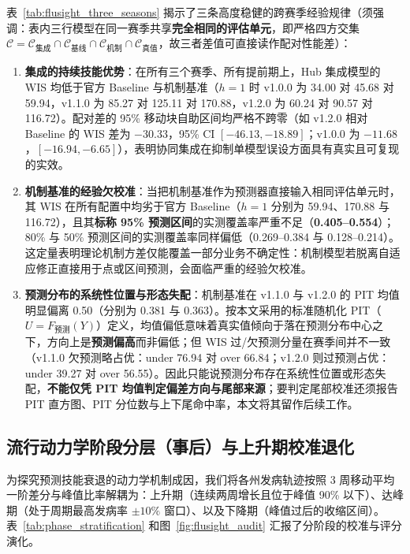 \documentclass[11pt,a4paper]{article}
\theoremstyle{plain}
\theoremstyle{definition}
\begin{document}
表~\ref{tab:flusight_three_seasons} 揭示了三条高度稳健的跨赛季经验规律（须强调：表内三行模型在同一赛季共享\textbf{完全相同的评估单元}，即严格四方交集 $\mathcal{C}=\mathcal{C}_{\text{集成}}\cap\mathcal{C}_{\text{基线}}\cap\mathcal{C}_{\text{机制}}\cap\mathcal{C}_{\text{真值}}$，故三者差值可直接读作配对性能差）：
\begin{enumerate}
\item \textbf{集成的持续技能优势}：在所有三个赛季、所有提前期上，Hub 集成模型的 WIS 均低于官方 Baseline 与机制基准（$h=1$ 时 v1.0.0 为 34.00 对 45.68 对 59.94，v1.1.0 为 85.27 对 125.11 对 170.88，v1.2.0 为 60.24 对 90.57 对 116.72）。配对差的 95\% 移动块自助区间均严格不跨零（如 v1.2.0 相对 Baseline 的 WIS 差为 $-30.33$，95\% CI $[-46.13, -18.89]$；v1.0.0 为 $-11.68$，$[-16.94, -6.65]$），表明协同集成在抑制单模型误设方面具有真实且可复现的实效。
\item \textbf{机制基准的经验欠校准}：当把机制基准作为预测器直接输入相同评估单元时，其 WIS 在所有配置中均劣于官方 Baseline（$h=1$ 分别为 59.94、170.88 与 116.72），且其\textbf{标称 95\% 预测区间}的实测覆盖率严重不足（\textbf{0.405--0.554}）；80\% 与 50\% 预测区间的实测覆盖率同样偏低（0.269--0.384 与 0.128--0.214）。这定量表明理论机制方差仅能覆盖一部分业务不确定性：机制模型若脱离自适应修正直接用于点或区间预测，会面临严重的经验欠校准。
\item \textbf{预测分布的系统性位置与形态失配}：机制基准在 v1.1.0 与 v1.2.0 的 PIT 均值明显偏离 0.50（分别为 0.381 与 0.363）。按本文采用的标准随机化 PIT（$U=F_{\text{预测}}(Y)$）定义，均值偏低意味着真实值倾向于落在预测分布中心之下，方向上是\textbf{预测偏高}而非偏低；但 WIS 过/欠预测分量在赛季间并不一致（v1.1.0 欠预测略占优：under 76.94 对 over 66.84；v1.2.0 则过预测占优：under 39.27 对 over 56.55）。因此只能说预测分布存在系统性位置或形态失配，\textbf{不能仅凭 PIT 均值判定偏差方向与尾部来源}；要判定尾部校准还须报告 PIT 直方图、PIT 分位数与上下尾命中率，本文将其留作后续工作。
\end{enumerate}

\subsection{流行动力学阶段分层（事后）与上升期校准退化}\label{sec:phase_collapse}

为探究预测技能衰退的动力学机制成因，我们将各州发病轨迹按照 3 周移动平均一阶差分与峰值比率解耦为：上升期（连续两周增长且位于峰值 90\% 以下）、达峰期（处于周期最高发病率 $\pm 10\%$ 窗口）、以及下降期（峰值过后的收缩区间）。表~\ref{tab:phase_stratification} 和图~\ref{fig:flusight_audit} 汇报了分阶段的校准与评分演化。
\end{document}
